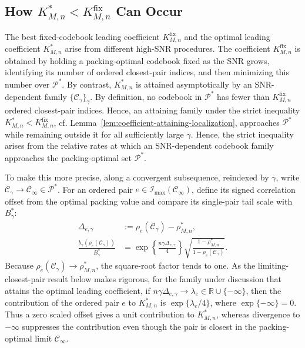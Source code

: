 \documentclass[12pt,draftclsnofoot,onecolumn]{IEEEtran}
\newcommand{\cC}{\mathcal{C}}
\newcommand{\cI}{\mathcal{I}}
\newcommand{\cP}{\mathcal{P}}
\theoremstyle{definition}
\begin{document}
\subsection{How \texorpdfstring{\(K^{\ast}_{M,n}<K^{\mathrm{fix}}_{M,n}\)}
{K* < Kfix} Can Occur}
\label{subsec:strict-coefficient-inequality}

The best fixed-codebook leading coefficient \(K^{\mathrm{fix}}_{M,n}\)
and the optimal leading coefficient \(K^{\ast}_{M,n}\) arise from
different high-SNR procedures.
The coefficient \(K^{\mathrm{fix}}_{M,n}\) is obtained by holding a
packing-optimal codebook fixed as the SNR grows, identifying its number
of ordered closest-pair indices, and then minimizing this number over
\(\cP^{\ast}\).  By contrast, \(K^{\ast}_{M,n}\) is attained
asymptotically by an SNR-dependent family
\(\{\cC_\gamma\}_\gamma\).  By definition, no codebook in
\(\cP^{\ast}\) has fewer than \(K^{\mathrm{fix}}_{M,n}\) ordered
closest-pair indices.  Hence, an attaining
family under the strict inequality
\(K^{\ast}_{M,n}<K^{\mathrm{fix}}_{M,n}\), cf.
Lemma~\ref{lem:coefficient-attaining-localization}, approaches \(\cP^{\ast}\)
while remaining outside it for all sufficiently large \(\gamma\).
Hence, the strict inequality arises from the relative rates at which an
SNR-dependent codebook family approaches the packing-optimal set
\(\cP^{\ast}\).


To make this more precise, along a
convergent subsequence, reindexed by \(\gamma\), write
\(\cC_\gamma\to\cC_\infty\in\cP^{\ast}\).  For an ordered pair
\(e\in\cI_{\max}(\cC_\infty)\), define its signed correlation offset
from the optimal packing value and compare its single-pair tail scale
with \(B_\gamma^{\ast}\):
\begin{align}
  \Delta_{e,\gamma}
  &:=\rho_e(\cC_\gamma)-\rho^{\ast}_{M,n},
  \label{eq:section2-contact-gap}\\
  \frac{b_\gamma(\rho_e(\cC_\gamma))}{B_\gamma^{\ast}}
  &=
  \exp\!\left\{\frac{n\gamma\Delta_{e,\gamma}}4\right\}
  \sqrt{\frac{1-\rho^{\ast}_{M,n}}
  {1-\rho_e(\cC_\gamma)}}.
  \label{eq:pathwise-pair-scale-ratio}
\end{align}
Because \(\rho_e(\cC_\gamma)\to\rho^{\ast}_{M,n}\), the square-root
factor tends to one.  As the limiting-closest-pair result below makes
rigorous, for the family under discussion that attains the optimal leading
coefficient, if
\(n\gamma\Delta_{e,\gamma}\to
\lambda_e\in\mathbb{R}\cup\{-\infty\}\), then the contribution of
the ordered pair \(e\) to \(K^{\ast}_{M,n}\) is
\(\exp\{\lambda_e/4\}\), where \(\exp\{-\infty\}=0\).  Thus a zero
scaled offset gives a unit contribution to \(K^{\ast}_{M,n}\), whereas divergence to
\(-\infty\) suppresses the contribution even though the pair is closest
in the packing-optimal limit \(\cC_\infty\).
\end{document}
